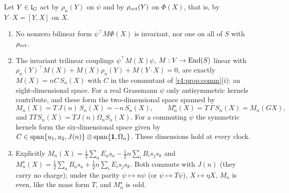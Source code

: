 \begin{theorem}
\label{r4:thm:couplings}
Let $Y\in\mathfrak l_G$ act by $\rho_n(Y)$ on $\psi$ and by $\rho_{\rm oct}(Y)$ on $\Phi(X)$, that is, by $Y\cdot X=[Y,X]$ on $X$.
\begin{enumerate}[label=(\roman*),leftmargin=2.2em]
\item No nonzero bilinear form $\psi^{\!\top}M\Phi(X)$ is invariant, nor one on all of $S$ with $\rho_{\rm oct}$.
\item The invariant trilinear couplings $\psi^{\!\top}M(X)\psi$, $M:V\to\operatorname{End}(S)$ linear with $\rho_n(Y)^{\!\top}M(X)+M(X)\rho_n(Y)+M(Y\cdot X)=0$, are exactly
$M(X)=nC\,S_n(X)$ with $C$ in the commutant of \cref{r4:prop:comm}(i): an eight-dimensional space. For a real Grassmann $\psi$ only antisymmetric
kernels contribute, and these form the two-dimensional space spanned by
\[
M_n(X)=T\,J(n)\,S_n(X)=-n\,S_n(X),\qquad M^\star_n(X)=T\,\Gamma\,S_n(X)=M_n(GX),
\]
and $T\Gamma S_n(X)=TJ(n)\Omega_nS_n(X)$.
For a commuting $\psi$ the symmetric kernels form the six-dimensional space given by
$C\in\operatorname{span}\{u_1,u_2,J(n)\}\otimes\operatorname{span}\{\mathbf 1,\Omega_n\}$. These dimensions hold at every clock.
\item Explicitly $M_n(X)=\tfrac12\sum_aE_as_a-\tfrac12n\sum_iB_is_js_k$ and $M^\star_n(X)=\tfrac12\sum_aB_as_a+\tfrac12n\sum_iE_is_js_k$. Both commute with $J(n)$ (they carry no
charge); under the parity $\psi\mapsto n\psi$ (or $\psi\mapsto T\psi$), $X\mapsto\eta X$, $M_n$ is even, like the mass form $T$, and $M^\star_n$ is odd.
\end{enumerate}
\end{theorem}

